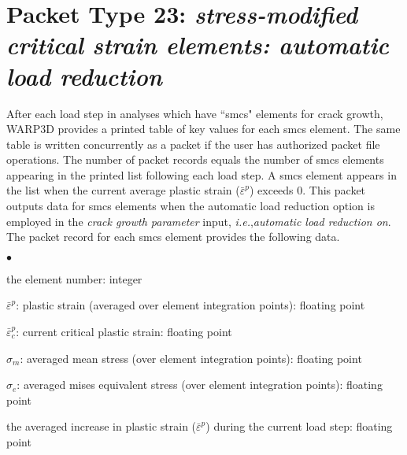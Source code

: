 \documentclass[10pt]{report}
\numberwithin{equation}{section}
\newcommand{\ie}{\ti{i.e.},\xspace}
\newcommand{\ti}{\emph}
\newcommand{\squishlist}{
 \begin{list}{$\bullet$}
  { \setlength{\itemsep}{0pt}
     \setlength{\parsep}{3pt}
     \setlength{\topsep}{3pt}
     \setlength{\partopsep}{0pt}
     \setlength{\leftmargin}{1.5em}
     \setlength{\labelwidth}{1em}
     \setlength{\labelsep}{0.5em} } }
\newcommand{\squishend}{
  \end{list}  }
\begin{document}
%
%
\section{Packet Type 23: \ti{stress-modified critical strain elements: 
automatic load reduction}}
After each load step in analyses which have ``smcs" elements for crack 
growth, WARP3D provides a printed table of key values for each smcs element. 
The same table is written concurrently as a packet if the user has authorized 
packet file operations. The number of packet records equals the number of 
smcs elements appearing in the printed list following each load step. A 
smcs element appears in the list when the current average plastic 
strain ($\bar \varepsilon^p$) exceeds 0. This packet outputs data for 
smcs elements when 
the automatic load reduction option is employed in the \ti{crack 
growth parameter} input, \ie \ti{automatic load reduction on}. 
The packet record for each smcs element provides the following data.
\squishlist
\item the element number:  integer
\item $\bar \varepsilon^p$:  plastic strain (averaged over element 
integration points):  floating point
\item $\bar \varepsilon^p_c$:  current critical plastic strain: 
 floating point
\item $\sigma_m$:  averaged mean stress (over element 
integration points):  floating point
\item $\sigma_e$: averaged mises equivalent stress (over 
element integration points):  floating point
\item the averaged increase in plastic strain ($\bar \varepsilon^p$) during 
the current load step:  floating point 
\squishend

%
%
\end{document}
